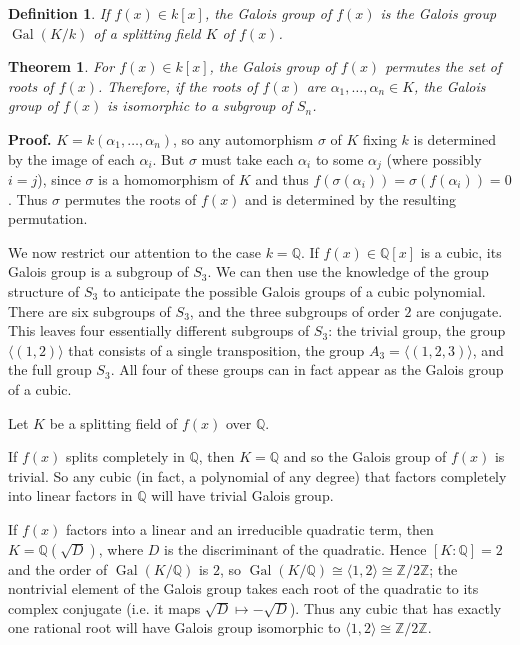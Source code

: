 \documentclass[12pt]{article}
\newcommand{\Rats}{\mathbb{Q}}
\newcommand{\Ints}{\mathbb{Z}}
\newtheorem{thm}{Theorem}
\newtheorem{defn}{Definition}
\DeclareMathOperator{\Gal}{Gal}
\begin{document}
\begin{defn} If $f(x)\in k[x]$, the \emph{Galois group of $f(x)$} is the Galois group $\Gal(K/k)$ of a splitting field $K$ of $f(x)$.
\end{defn}

\begin{thm} For $f(x)\in k[x]$, the Galois group of $f(x)$ permutes the set of roots of $f(x)$. Therefore, if the roots of $f(x)$ are $\alpha_1,\ldots,\alpha_n\in K$, the Galois group of $f(x)$ is isomorphic to a subgroup of $S_n$.
\end{thm}
\textbf{Proof.} $K=k(\alpha_1,\ldots,\alpha_n)$, so any automorphism $\sigma$ of $K$ fixing $k$ is determined by the image of each $\alpha_i$. But $\sigma$ must take each $\alpha_i$ to some $\alpha_j$ (where possibly $i=j$), since $\sigma$ is a homomorphism of $K$ and thus $f(\sigma(\alpha_i))=\sigma(f(\alpha_i))=0$. Thus $\sigma$ permutes the roots of $f(x)$ and is determined by the resulting permutation.

We now restrict our attention to the case $k=\Rats$. If $f(x)\in\Rats[x]$ is a cubic, its Galois group is a subgroup of $S_3$. We can then use the knowledge of the group structure of $S_3$ to anticipate the possible Galois groups of a cubic polynomial. There are six subgroups of $S_3$, and the three subgroups of order $2$ are conjugate. This leaves four essentially different subgroups of $S_3$: the trivial group, the group $\langle(1,2)\rangle$ that consists of a single transposition, the group $A_3=\langle (1,2,3)\rangle$, and the full group $S_3$. All four of these groups can in fact appear as the Galois group of a cubic.

Let $K$ be a splitting field of $f(x)$ over $\Rats$.

If $f(x)$ splits completely in $\Rats$, then $K=\Rats$ and so the Galois group of $f(x)$ is trivial. So any cubic (in fact, a polynomial of any degree) that factors completely into linear factors in $\Rats$ will have trivial Galois group.

If $f(x)$ factors into a linear and an irreducible quadratic term, then $K=\Rats(\sqrt{D})$, where $D$ is the discriminant of the quadratic.  Hence $[K:\Rats]=2$ and the order of $\Gal(K/\Rats)$ is $2$, so $\Gal(K/\Rats)\cong \langle1,2\rangle\cong\Ints/2\Ints$; the nontrivial element of the Galois group takes each root of the quadratic to its complex conjugate (i.e. it maps $\sqrt{D}\mapsto -\sqrt{D}$). Thus any cubic that has exactly one rational root will have Galois group isomorphic to $\langle 1,2\rangle\cong \Ints/2\Ints$.
\end{document}
